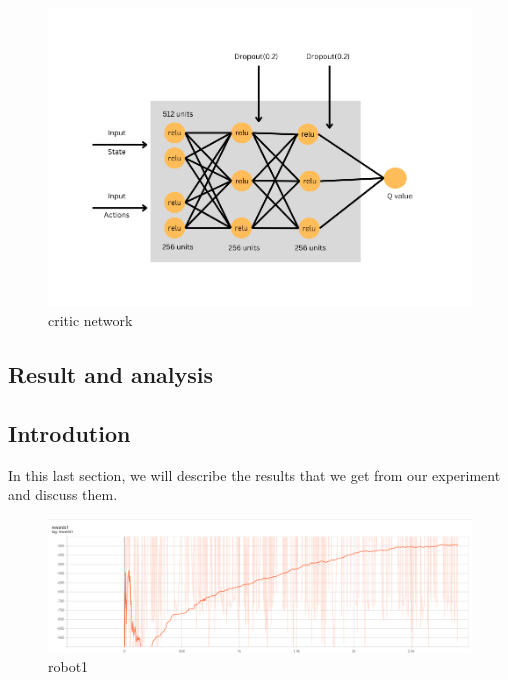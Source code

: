 \documentclass[12pt]{extarticle}
\begin{document}
 \begin{figure}[h]  
\centering
\includegraphics[scale=0.60]{critic_net}
\caption[critic network]{critic network}
\end{figure}

\afterpage{\clearpage}








\newpage
\pagebreak
\hspace{0pt}
\vfill
\begin{center}
\section{Result and analysis}
\end{center}
\vfill
\hspace{0pt}

\pagebreak

\subsection{Introdution}

In this last section, we will describe the results that we get from our experiment and discuss them.



\begin{figure}[h]  

\includegraphics[scale=0.35]{robot1}
\caption[robot1]{robot1}
\end{figure}
\end{document}
